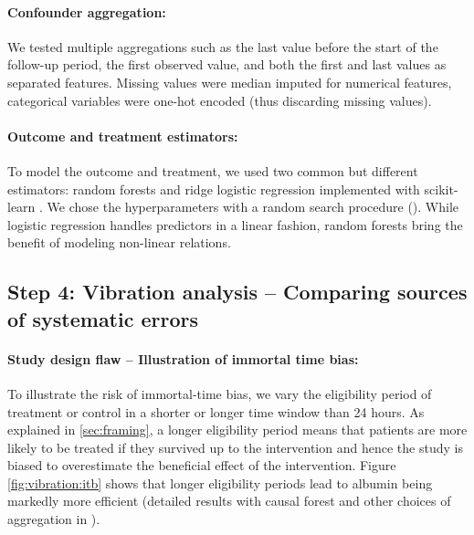 \documentclass[10pt,letterpaper]{article}
\begin{document}
\paragraph{Confounder aggregation:}

We tested multiple aggregations such as the last value before the start of the
follow-up period, the first observed value, and both the first and last values
as separated features. Missing values were median imputed for numerical
features, categorical variables were one-hot encoded (thus discarding missing values).


\paragraph{Outcome and treatment estimators:}

To model the outcome and treatment, we used two common but different
estimators: random forests and ridge logistic regression implemented with scikit-learn
\cite{pedregosa2011scikit}. We chose the
hyperparameters with a random search procedure (). While logistic regression handles
predictors in a linear fashion, random forests bring the benefit of modeling
non-linear relations.


\subsection*{Step 4: Vibration analysis -- Comparing sources of systematic errors}%
\label{sec:vibration_analysis_mimic_iv}


\paragraph{Study design flaw -- Illustration of immortal time bias:}

To illustrate the risk of immortal-time bias, we vary the eligibility period of
treatment or control in a shorter or longer time window than 24 hours. As
explained in \autoref{sec:framing}, a longer eligibility period means that
patients are more likely to be treated if they survived up to the intervention
and hence the study is biased to overestimate the beneficial effect of the
intervention. Figure \ref{fig:vibration:itb} shows that longer eligibility
periods lead to albumin being markedly more efficient (detailed results with causal forest and other choices of aggregation in ).
\end{document}
